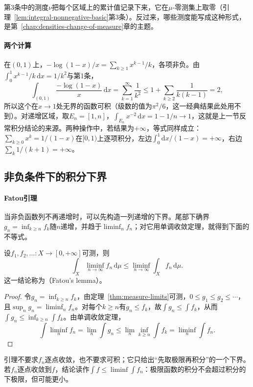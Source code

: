 第3条中的测度$\nu$把每个区域上的累计值记录下来，它在$\mu$-零测集上取零（引理~\ref{lem:integral-nonnegative-basic}第3条）。反过来，哪些测度能写成这种形式，是第~\ref{chap:densities-change-of-measure}章的主题。

\paragraph{两个计算}
在$(0,1)$上，$-\log(1-x)/x=\sum_{k\ge1}x^{k-1}/k$，各项非负。由$\int_0^1x^{k-1}/k\,\mathrm dx=1/k^2$与第1条，
\[
 \int_{(0,1)}\frac{-\log(1-x)}x\,\mathrm dx=\sum_{k=1}^\infty\frac1{k^2}\le1+\sum_{k\ge2}\frac1{k(k-1)}=2,
\]
所以这个在$x\to1$处无界的函数可积（级数的值为$\pi^2/6$，这一经典结果此处用不到）。对递增区域，取$E_n=[1,n]$，$\int_{E_n}x^{-2}\,\mathrm dx=1-1/n\to1$，这就是上一节反常积分结论的来源。两种操作中，若结果为$+\infty$，等式同样成立：$\sum_{k\ge0}x^k=1/(1-x)$在$[0,1)$上逐项积分，左边$\int_0^1\mathrm dx/(1-x)=+\infty$，右边$\sum_k1/(k+1)=+\infty$。

\subsection{非负条件下的积分下界}
\label{sec:integral-limits-fatou}

\paragraph{Fatou引理}
当非负函数列不再递增时，可以先构造一列递增的下界。尾部下确界$g_n=\inf_{k\ge n}f_k$随$n$递增，并趋于$\liminf_nf_n$；对它用单调收敛定理，就得到下面的不等式。

\begin{lemma}[Fatou引理]
\label{lem:integral-fatou}
设$f_1,f_2,\dots:X\to[0,+\infty]$可测，则
\[
 \int_X\liminf_{n\to\infty}f_n\,\mathrm d\mu\le\liminf_{n\to\infty}\int_Xf_n\,\mathrm d\mu.
\]
这一结论称为（Fatou's lemma）。
\end{lemma}

\begin{proof}
令$g_n=\inf_{k\ge n}f_k$，由定理~\ref{thm:measure-limits}可测，$0\le g_1\le g_2\le\cdots$，且$\sup_ng_n=\liminf_nf_n$。对每个$k\ge n$有$g_n\le f_k$，故$\int g_n\le\int f_k$，从而$\int g_n\le\inf_{k\ge n}\int f_k$。由单调收敛定理，
\[
 \int\liminf_nf_n=\lim_n\int g_n\le\lim_n\inf_{k\ge n}\int f_k=\liminf_n\int f_n.
\]
\end{proof}

引理不要求$f_n$逐点收敛，也不要求可积；它只给出“先取极限再积分”的一个下界。若$f_n$逐点收敛到$f$，结论读作$\int f\le\liminf\int f_n$：极限函数的积分不会超过积分的下极限，但可能更小。

